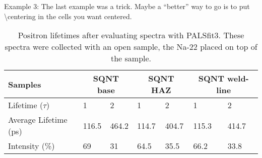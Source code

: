 \documentclass{article}
\begin{document}
Example 3:
The last example was a trick.  Maybe a ``better'' way to go is to put \textbackslash centering in the cells you want centered.

\begin{table}[h]
	\centering
	\begin{tabular}[c]{|p{2.5cm}|p{1.5cm}|p{1.5cm}|p{1.5cm}|p{1.5cm}|p{1.5cm}|p{1.5cm}|} \hline
		Samples & \multicolumn{2}{|c|}{SQNT base} & \multicolumn{2}{|c|}{SQNT HAZ} & \multicolumn{2}{|c|}{SQNT weld-line} \\ \hline
		Lifetime ($\tau$)      & 1     & 2     & 1     & 2     & 1     & 2     \\  \hline
		Average Lifetime (ps)  & 116.5 & 464.2 & 114.7 & 404.7 & 115.3 & 414.7 \\  \hline
		Intensity (\%)         & 69    & 31    & 64.5  & 35.5  & 66.2  & 33.8  \\  \hline
	\end{tabular}
	\caption{Positron lifetimes after evaluating spectra with PALSfit3. These spectra were collected with an open sample, the Na-22 placed on top of the sample.}
	\label{OpenResults}
\end{table}
\end{document}

